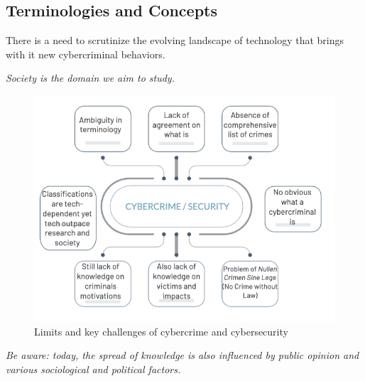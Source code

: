 \clearpage

\subsection{Terminologies and Concepts}

\raggedright
There is a need to scrutinize the evolving landscape of technology that brings with it new cybercriminal behaviors.

\raggedleft \textit{Society is the domain we aim to study.}

\begin{figure}[H]
    \includegraphics[width=\linewidth]{Images/Sociology/securityLimits.png}
    \caption{Limits and key challenges of cybercrime and cybersecurity}
    \label{fig:cyberLimits}
\end{figure}

\centering
\textit{Be aware: today, the spread of knowledge is also influenced by public opinion and various sociological and political factors.}

\clearpage